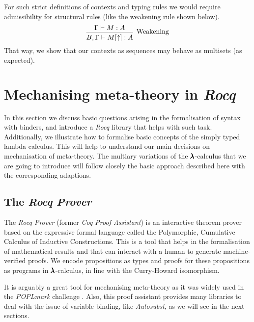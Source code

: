 \begin{remark}
  \label{nameless_typing_remark}
  For such strict definitions of contexts and typing rules we would require admissibility for structural rules (like the weakening rule shown below).
  \[
    \begin{prooftree}
      \hypo{ \Gamma \vdash M:A }
      \infer1[Weakening]{ B, \Gamma \vdash M[\uparrow]:A } 
    \end{prooftree}
  \]
  That way, we show that our contexts as sequences may behave as multisets (as expected).
\end{remark}


\section{Mechanising meta-theory in \textit{Rocq}}

In this section we discuss basic questions arising in the formalisation of syntax with binders, and introduce a \textit{Rocq} library that helps with such task.
Additionally, we illustrate how to formalise basic concepts of the simply typed lambda calculus.
This will help to understand our main decisions on mechanisation of meta-theory.
The multiary variations of the $\pmb{\lambda}$-calculus that we are going to introduce will follow closely the basic approach described here with the corresponding adaptions.

\subsection{The \textit{Rocq Prover}}

The \textit{Rocq Prover} (former \textit{Coq Proof Assistant}) \cite{RocqManual} is an interactive theorem prover based on the expressive formal language called the Polymorphic, Cumulative Calculus of Inductive Constructions.
This is a tool that helps in the formalisation of mathematical results and that can interact with a human to generate machine-verified proofs.
We encode propositions as types and proofs for these propositions as programs in $\pmb{\lambda}$-calculus, in line with the Curry-Howard isomorphism.

It is arguably a great tool for mechanising meta-theory as it was widely used in the \textit{POPLmark} challenge \cite{POPLmark}.
Also, this proof assistant provides many libraries to deal with the issue of variable binding, like \textit{Autosubst}, as we will see in the next sections.

